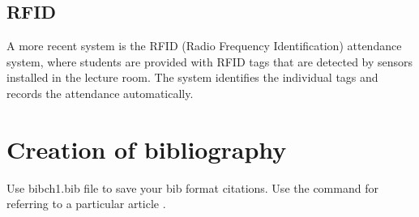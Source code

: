  \subsection{RFID}
 A more recent system is the RFID (Radio Frequency Identification) attendance system, where students are provided with RFID tags that are detected by sensors installed in the lecture room. The system identifies the individual tags and records the attendance automatically.
\section{Creation of bibliography}
Use bibch1.bib file to save your bib format citations. Use the command \cite{saini2010alternative} for referring to a particular article \cite{imre2006majority}. 





